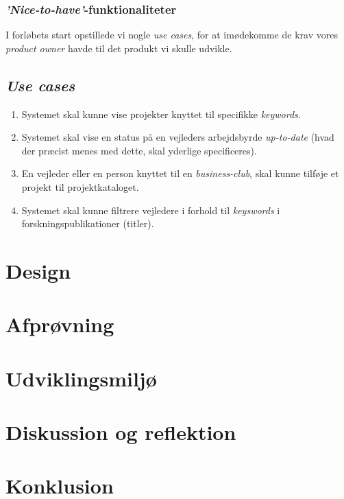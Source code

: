 \documentclass[12pt]{article}
\begin{document}
\subsubsection{\textit{'Nice-to-have'}-funktionaliteter}
\label{sec:krav}
I forløbets start opstillede vi nogle \textit{use cases}, for at imødekomme de krav vores \textit{product owner} havde til det produkt vi skulle udvikle.

\subsection{\textit{Use cases}}
\begin{enumerate}
  \item Systemet skal kunne vise projekter knyttet til specifikke \textit{keywords}.

  \item Systemet skal vise en status på en vejleders arbejdsbyrde \textit{up-to-date} (hvad der præcist menes med dette, skal yderlige specificeres).
  \item En vejleder eller en person knyttet til en \textit{business-club}, skal kunne tilføje et projekt til projektkataloget.

	\item Systemet skal kunne filtrere vejledere i forhold til \textit{keyswords} i forskningspublikationer (titler).
\end{enumerate}


\section{Design}
\label{sec:design}

\section{Afprøvning}
\label{sec:afproevning}

\section{Udviklingsmiljø}
\label{sec:udvikling}

\section{Diskussion og reflektion}
\label{sec:diskussion}

\section{Konklusion}
\label{sec:konklusion}
\end{document}
